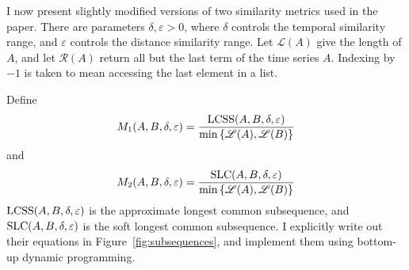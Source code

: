 \par
I now present slightly modified versions of two similarity metrics used in the paper.
There are parameters $\delta,\varepsilon>0$, where $\delta$ controls the temporal similarity range, and $\varepsilon$ controls the distance similarity range.
Let $\mathscr{L}(A)$ give the length of $A$, and let $\mathscr{R}(A)$ return all but the last term of the time series $A$.
Indexing by $-1$ is taken to mean accessing the last element in a list.
\par
Define
\begin{equation}
	M_{1}(A,B,\delta,\varepsilon)=\frac{\operatorname{LCSS}(A,B,\delta,\varepsilon)}{\min\left\{\mathscr{L}(A),\mathscr{L}(B)\right\}}
	\label{eq:m1}
\end{equation}
and
\begin{equation}
	M_{2}(A,B,\delta,\varepsilon)=\frac{\operatorname{SLC}(A,B,\delta,\varepsilon)}{\min\left\{\mathscr{L}(A),\mathscr{L}(B)\right\}}
	\label{eq:m2}
\end{equation}
$\operatorname{LCSS}(A,B,\delta,\varepsilon)$ is the approximate longest common subsequence, and $\operatorname{SLC}(A,B,\delta,\varepsilon)$ is the soft longest common subsequence.
I explicitly write out their equations in Figure~\ref{fig:subsequences}, and implement them using bottom-up dynamic programming.

